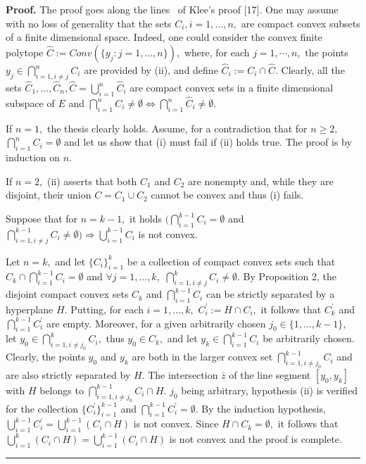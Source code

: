 \documentclass{article}
\newenvironment{proof}[1][Proof]{\noindent\textbf{#1.} }{\ \rule{0.5em}{0.5em}}
\begin{document}
\begin{proof}
The proof goes along the lines \ of Klee's proof [17]. One may assume with
no loss of generality that the sets $C_{i},i=1,\ldots ,n,$ are compact
convex subsets of a finite dimensional space. Indeed, one could consider the
convex finite polytope $\hat{C}:=Conv(\{y_{j}:j=1,\ldots ,n\}),$ where, for
each $j=1,\cdots ,n,$ the points $y_{j}\in \bigcap_{i=1,i\neq j}^{n}C_{i}$
are provided by (ii), and define $\hat{C}_{i}:=C_{i}\cap \hat{C}.$ Clearly,
all the sets $\hat{C}_{1},\ldots ,\hat{C}_{n},\hat{C}=\bigcup_{i=1}^{n}\hat{C%
}_{i}$ are compact convex sets in a finite dimensional subspace of $E$ and $%
\bigcap_{i=1}^{n}C_{i}\neq \emptyset \Longleftrightarrow \bigcap_{i=1}^{n}%
\hat{C}_{i}\neq \emptyset .$

If $n=1,$ the thesis clearly holds. Assume, for a contradiction that for $%
n\geq 2,$ $\bigcap_{i=1}^{n}C_{i}=\emptyset $ and let us show that (i) must
fail if (ii) holds true. The proof is by induction on $n.$

If $n=2,$ (ii) asserts that both $C_{1}$ and $C_{2}$ are nonempty and, while
they are disjoint, their union $C=C_{1}\cup C_{2}$ cannot be convex and thus
(i) fails.

Suppose that for $n=k-1,$ it holds $(\bigcap_{i=1}^{k-1}C_{i}=\emptyset $
and $\bigcap_{i=1,i\neq j}^{k-1}C_{i}\neq \emptyset )\Longrightarrow
\bigcup_{i=1}^{k-1}C_{i}$ is not convex.

Let $n=k,$ and let $\{C_{i}\}_{i=1}^{k}$ be a collection of compact convex
sets such that $C_{k}\cap \bigcap_{i=1}^{k-1}C_{i}=\emptyset $ and $\forall
j=1,...,k,$ $\bigcap_{i=1,i\neq j}^{k}C_{i}\neq \emptyset .$ By Proposition
2, the disjoint compact convex sets $C_{k}$ and $\bigcap_{i=1}^{k-1}C_{i}$
can be strictly separated by a hyperplane $H.$ Putting, for each $i=1,\ldots
,k,$ $C_{i}^{\prime }:=H\cap C_{i},$ it follows that $C_{k}^{\prime }$ and $%
\bigcap_{i=1}^{k-1}C_{i}^{\prime }$ are empty. Moreover, for a given
arbitrarily chosen $j_{0}\in \{1,\ldots ,k-1\},$ let $y_{0}\in
\bigcap_{i=1,i\neq j_{0}}^{k}C_{i},$ thus $y_{0}\in C_{k},$ and let $%
y_{k}\in \bigcap_{i=1}^{k-1}C_{i}$ be arbitrarily chosen. Clearly, the
points $y_{0}$ and $y_{k}$ are both in the larger convex set $%
\bigcap_{i=1,i\neq j_{0}}^{k-1}C_{i}$ and are also strictly separated by $H.$
The intersection $\bar{z}$ of the line segment $[y_{0},y_{k}]$ with $H$
belongs to $\bigcap_{i=1,i\neq j_{0}}^{k-1}C_{i}\cap H.$ $j_{0}$ being
arbitrary, hypothesis (ii) is verified for the collection $\{C_{i}^{\prime
}\}_{i=1}^{k-1}$ and $\bigcap_{i=1}^{k-1}C_{i}^{\prime }=\emptyset .$ By the
induction hypothesis, $\bigcup_{i=1}^{k-1}C_{i}^{\prime
}=\bigcup_{i=1}^{k-1}(C_{i}\cap H)$ is not convex$.$ Since $H\cap
C_{k}=\emptyset ,$ it follows that $\bigcup_{i=1}^{k}(C_{i}\cap
H)=\bigcup_{i=1}^{k-1}(C_{i}\cap H)$ is not convex and the proof is
complete.\bigskip
\end{proof}
\end{document}
